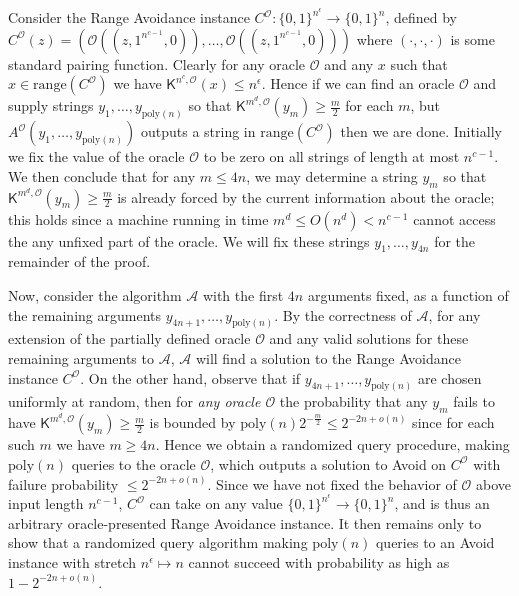 Consider the Range Avoidance instance $C^{\mathcal{O}}:\{0,1\}^{n^{\epsilon}}\to\{0,1\}^{n}$, defined by $C^{\mathcal{O}}(z)=(\mathcal{O}((z,1^{n^{c-1}},0)),\ldots,\mathcal{O}((z,1^{n^{c-1}},0)))$ where $(\cdot,\cdot,\cdot)$ is some standard pairing function. Clearly for any oracle $\mathcal{O}$ and any $x$ such that $x\in\mathrm{range}(C^{\mathcal{O}})$ we have ${\mathsf{K}}^{n^{c},\mathcal{O}}(x)\leq n^{\epsilon}$. Hence if we can find an oracle $\mathcal{O}$ and supply strings $y_{1},\ldots,y_{\mathrm{poly}(n)}$ so that ${\mathsf{K}}^{m^{d},\mathcal{O}}(y_{m})\geq\frac{m}{2}$ for each $m$, but $A^{\mathcal{O}}(y_{1},\ldots,y_{\mathrm{poly}(n)})$ outputs a string in $\mathrm{range}(C^{\mathcal{O}})$ then we are done. Initially we fix the value of the oracle $\mathcal{O}$ to be zero on all strings of length at most $n^{c-1}$. We then conclude that for any $m\leq 4n$, we may determine a string $y_{m}$ so that ${\mathsf{K}}^{m^{d},\mathcal{O}}(y_{m})\geq\frac{m}{2}$ is already forced by the current information about the oracle; this holds since a machine running in time $m^{d}\leq O(n^{d})<n^{c-1}$ cannot access the any unfixed part of the oracle. We will fix these strings $y_{1},\ldots,y_{4n}$ for the remainder of the proof.\par




Now, consider the algorithm $\mathcal{A}$ with the first $4n$ arguments fixed, as a function of the remaining arguments $y_{4n+1},\ldots,y_{\mathrm{poly}(n)}$. By the correctness of $\mathcal{A}$, for any extension of the partially defined oracle $\mathcal{O}$ and any valid solutions for these remaining arguments to $\mathcal{A}$, $\mathcal{A}$ will find a solution to the Range Avoidance instance $C^{\mathcal{O}}$. On the other hand, observe that if $y_{4n+1},\ldots,y_{\mathrm{poly}(n)}$ are chosen uniformly at random, then for \emph{any oracle $\mathcal{O}$} the probability that any $y_{m}$ fails to have ${\mathsf{K}}^{m^{d},\mathcal{O}}(y_{m})\geq\frac{m}{2}$ is bounded by $\mathrm{poly}(n)2^{-\frac{m}{2}}\leq 2^{-2n+o(n)}$ since for each such $m$ we have $m\geq 4n$. Hence we obtain a randomized query procedure, making $\mathrm{poly}(n)$ queries to the oracle $\mathcal{O}$, which outputs a solution to Avoid on $C^{\mathcal{O}}$ with failure probability $\leq 2^{-2n+o(n)}$. Since we have not fixed the behavior of $\mathcal{O}$ above input length $n^{c-1}$, $C^{\mathcal{O}}$ can take on any value $\{0,1\}^{n^{\epsilon}}\to\{0,1\}^{n}$, and is thus an arbitrary oracle-presented Range Avoidance instance. It then remains only to show that a randomized query algorithm making $\mathrm{poly}(n)$ queries to an Avoid instance with stretch $n^{\epsilon}\mapsto n$ cannot succeed with probability as high as $1-2^{-2n+o(n)}$.\par




